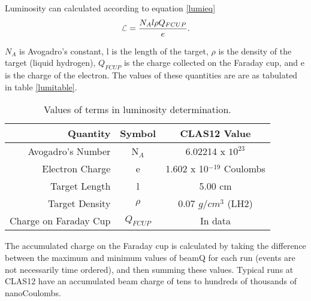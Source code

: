 



Luminosity can calculated according to equation \ref{lumieq}
 \begin{equation}\label{lumieq}
            \Lumi = \frac{N_A l \rho Q_{FCUP}}{e}.
\end{equation}

$N_A$ is Avogadro's constant, l is the length of the target,  $\rho$ is the density of the target (liquid hydrogen), $Q_{FCUP}$ is the charge collected on the Faraday cup, and e is the charge of the electron. The values of these quantities are are as tabulated in table \ref{lumitable}. 


\begin{table}[h]
    \centering
    \begin{tabular}{rcc}
        Quantity & Symbol & CLAS12 Value \\\hline
       Avogadro's Number &  N$_A$  & 6.02214 x $10^{23}$ \\
        Electron Charge &e  &  1.602 x 10$^{-19}$ Coulombs \\
        Target Length &l &  5.00 cm \\
        Target Density &$\rho$  &  0.07 $g/cm^3$ (LH2) \\
        Charge on Faraday Cup & $Q_{FCUP}$ &  In data\\
    \end{tabular}
\caption[Terms of Luminosity Equation]{Values of terms in luminosity determination.}
\end{table}\label{lumitable}

The accumulated charge on the Faraday cup is calculated by taking the difference between the maximum and minimum values of beamQ for each run (events are not necessarily time ordered), and then summing these values. Typical runs at CLAS12 have an accumulated beam charge of tens to hundreds of thousands of nanoCoulombs. 

